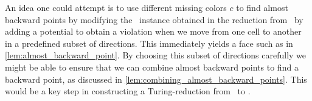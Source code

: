 An idea one could attempt is to use different missing colors $c$ to find almost backward points by modifying the \EndOfLine\ instance obtained in the reduction from \Tarskistar\ by adding a potential to obtain a violation when we move from one cell to another in a predefined subset of directions. This immediately yields a face such as in \cref{lem:almost_backward_point}. By choosing this subset of directions carefully we might be able to ensure that we can combine almost backward points to find a backward point, as discussed in \cref{lem:combining_almost_backward_points}. This would be a key step in constructing a Turing-reduction from \Tarskistar\ to \EndOfPotentialLine\@.